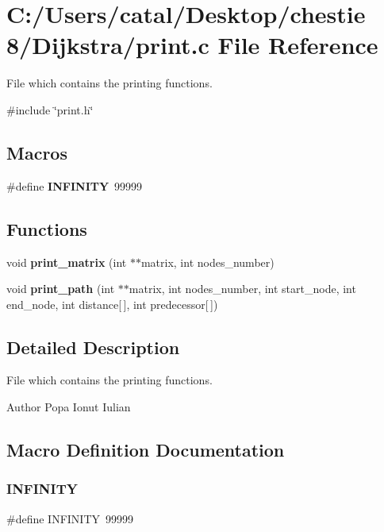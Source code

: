 \section{C\+:/\+Users/catal/\+Desktop/chestie 8/\+Dijkstra/print.c File Reference}
\label{print_8c}


File which contains the printing functions.  


{\ttfamily \#include \char`\"{}print.\+h\char`\"{}}\newline
\subsection*{Macros}
\begin{DoxyCompactItemize}
\item 
\#define \textbf{ I\+N\+F\+I\+N\+I\+TY}~99999
\end{DoxyCompactItemize}
\subsection*{Functions}
\begin{DoxyCompactItemize}
\item 
void \textbf{ print\+\_\+matrix} (int $\ast$$\ast$matrix, int nodes\+\_\+number)
\item 
void \textbf{ print\+\_\+path} (int $\ast$$\ast$matrix, int nodes\+\_\+number, int start\+\_\+node, int end\+\_\+node, int distance[$\,$], int predecessor[$\,$])
\end{DoxyCompactItemize}


\subsection{Detailed Description}
File which contains the printing functions. 

\begin{DoxyAuthor}{Author}
Popa Ionut Iulian 
\end{DoxyAuthor}


\subsection{Macro Definition Documentation}
\mbox{\label{print_8c_a956e2723d559858d08644ac99146e910}} 
\subsubsection{I\+N\+F\+I\+N\+I\+TY}
{\footnotesize\ttfamily \#define I\+N\+F\+I\+N\+I\+TY~99999}



